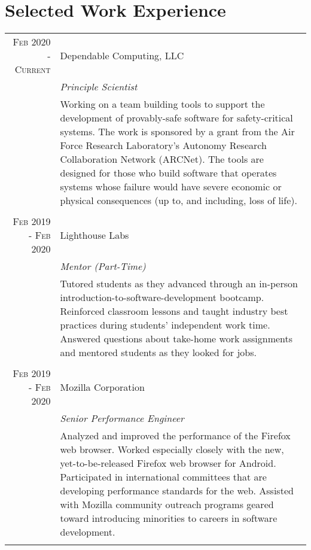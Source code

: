 \documentclass[a4paper,10pt]{article} %
\begin{document}
\section{Selected Work Experience}
\begin{tabular}{r|p{11cm}}

\textsc{Feb 2020 - Current} & Dependable Computing, LLC \\
& \emph{Principle Scientist}\\ 
& \footnotesize{Working on a team building tools to support the development of provably-safe software for safety-critical systems. The work is sponsored by a grant from the Air Force Research Laboratory's Autonomy Research Collaboration Network (ARCNet). The tools are designed for those who build software that operates systems whose failure would have severe economic or physical consequences (up to, and including, loss of life). }\\
\multicolumn{2}{c}{ } \\

\textsc{Feb 2019 - Feb 2020} & Lighthouse Labs \\
& \emph{Mentor (Part-Time)}\\ 
& \footnotesize{Tutored students as they advanced through an in-person introduction-to-software-development bootcamp. Reinforced classroom lessons and taught industry best practices during students' independent work time. Answered questions about take-home work assignments and mentored students as they looked for jobs.}\\
\multicolumn{2}{c}{ } \\

\textsc{Feb 2019 - Feb 2020} & Mozilla Corporation \\
& \emph{Senior Performance Engineer}\\ 
& \footnotesize{Analyzed and improved the performance of the Firefox web browser. Worked especially closely with the new, yet-to-be-released Firefox web browser for Android. Participated in international committees that are developing performance standards for the web. Assisted with Mozilla community outreach programs geared toward introducing minorities to careers in software development.}\\
\multicolumn{2}{c}{ } \\


\end{tabular}
\end{document}
